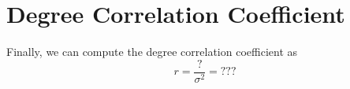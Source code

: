 \section{Degree Correlation Coefficient}

Finally, we can compute the degree correlation coefficient as
\[
    r = \frac{?}{\sigma^2} = ???
\]
